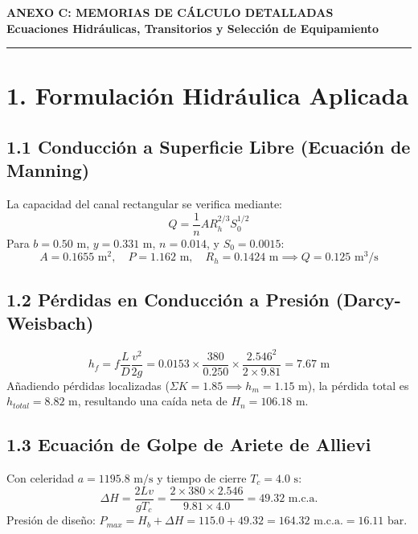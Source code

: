 \documentclass[11pt,a4paper]{article}
\begin{document}
\begin{center}
    {\LARGE\bfseries\textcolor{navyblue}{ANEXO C: MEMORIAS DE CÁLCULO DETALLADAS}}\\[0.6em]
    {\large\bfseries Ecuaciones Hidráulicas, Transitorios y Selección de Equipamiento}\\[1.2em]
    \rule{\linewidth}{1.2pt}
\end{center}


\section*{1. Formulación Hidráulica Aplicada}
\subsection*{1.1 Conducción a Superficie Libre (Ecuación de Manning)}
La capacidad del canal rectangular se verifica mediante:
\begin{equation}
Q = \frac{1}{n} A R_h^{2/3} S_0^{1/2}
\end{equation}
Para $b = 0.50\text{ m}$, $y = 0.331\text{ m}$, $n = 0.014$, y $S_0 = 0.0015$:
\begin{equation}
A = 0.1655\text{ m}^2, \quad P = 1.162\text{ m}, \quad R_h = 0.1424\text{ m} \implies Q = 0.125\text{ m}^3/\text{s}
\end{equation}

\subsection*{1.2 Pérdidas en Conducción a Presión (Darcy-Weisbach)}
\begin{equation}
h_f = f \frac{L}{D} \frac{v^2}{2g} = 0.0153 \times \frac{380}{0.250} \times \frac{2.546^2}{2 \times 9.81} = 7.67\text{ m}
\end{equation}
Añadiendo pérdidas localizadas ($\Sigma K = 1.85 \implies h_m = 1.15\text{ m}$), la pérdida total es $h_{total} = 8.82\text{ m}$, resultando una caída neta de $H_n = 106.18\text{ m}$.

\subsection*{1.3 Ecuación de Golpe de Ariete de Allievi}
Con celeridad $a = 1195.8\text{ m/s}$ y tiempo de cierre $T_c = 4.0\text{ s}$:
\begin{equation}
\Delta H = \frac{2 L v}{g T_c} = \frac{2 \times 380 \times 2.546}{9.81 \times 4.0} = 49.32\text{ m.c.a.}
\end{equation}
Presión de diseño: $P_{max} = H_b + \Delta H = 115.0 + 49.32 = 164.32\text{ m.c.a.} = 16.11\text{ bar}$.
\end{document}
